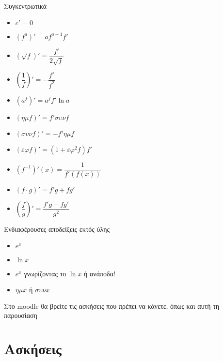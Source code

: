 \documentclass{presentation}
\begin{document}
\begin{frame}{Συγκεντρωτικά}
    \begin{small}
        \begin{multicols}{2}
            \begin{itemize}
                \item $c'=0$
                \item $(f^a)'=af^{a-1}f'$
                \item $\left(\sqrt{f}\right)'=\dfrac{f'}{2\sqrt{f}}$
                \item $\left( \dfrac{1}{f}\right)'=-\dfrac{f'}{f^2}$
                \item $(a^{f})'=a^{f}f'\ln a$
                \item $(ημf)'=f'συνf$
                \item $(συνf)'=-f'ημf$
                \item $(εφf)'=(1+εφ^2f)f'$
                \item $(f^{-1})'(x)=\dfrac{1}{f'(f(x))}$
                \item $(f\cdot g)'=f'g+fg'$
                \item $\left(\dfrac{f}{g}\right)'=\dfrac{f'g-fg'}{g^2}$
            \end{itemize}
        \end{multicols}
    \end{small}
\end{frame}

\begin{frame}{Ενδιαφέρουσες αποδείξεις εκτός ύλης}
    \label{Θεωρία}
    \begin{itemize}
        \item $e^x$ \hyperlink{Απόδειξη1}{}
        \item $\ln x$ \hyperlink{Απόδειξη2}{}
        \item $e^x$ γνωρίζοντας το $\ln x$ ή ανάποδα! \hyperlink{Απόδειξη3}{}
        \item $ημx$ ή $συνx$ \hyperlink{Απόδειξη4}{}
    \end{itemize}
\end{frame}

\begin{frame}[noframenumbering]
    Στο moodle θα βρείτε τις ασκήσεις που πρέπει να κάνετε, όπως και αυτή τη παρουσίαση
\end{frame}

\section{Ασκήσεις}
\end{document}
